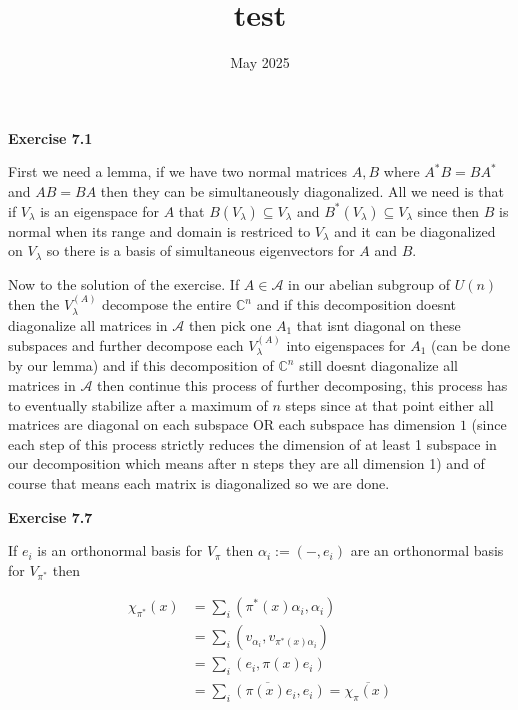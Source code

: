 \documentclass{article}
\title{test}
\date{May 2025}
\begin{document}
\vspace{0.5cm}

\textbf{Exercise 7.1}

\vspace{0.5cm}

First we need a lemma, if we have two normal matrices $A,B$ where $A^*B =BA^*$ and $AB = BA$ then they can be simultaneously diagonalized. All we need is that if $V_\lambda$ is an eigenspace for $A$ that $B(V_\lambda) \subseteq V_\lambda$ and $B^*(V_\lambda) \subseteq V_\lambda$ since then $B$ is normal when its range and domain is restriced to $V_\lambda$ and it can be diagonalized on $V_\lambda$ so there is a basis of simultaneous eigenvectors for $A$ and $B$. 

\vspace{0.3cm}

Now to the solution of the exercise. If $A \in\mathcal A$ in our abelian subgroup of $U(n)$ then the $V^{(A)}_\lambda$ decompose the entire $\mathbb C^n$ and if this decomposition doesnt diagonalize all matrices in $\mathcal A$ then pick one $A_1$ that isnt diagonal on these subspaces and further decompose each $V^{(A)}_\lambda$ into eigenspaces for $A_1$ (can be done by our lemma) and if this decomposition of $\mathbb C^n$ still doesnt diagonalize all matrices in $\mathcal A$ then continue this process of further decomposing, this process has to eventually stabilize after a maximum of $n$ steps since at that point either all matrices are diagonal on each subspace OR each subspace has dimension $1$ (since each step of this process strictly reduces the dimension of at least 1 subspace in our decomposition which means after n steps they are all dimension 1) and of course that means each matrix is diagonalized so we are done.

\vspace{0.5cm}

\textbf{Exercise 7.7}

\vspace{0.5cm}

If $e_i$ is an orthonormal basis for $V_\pi$ then $\alpha_i := (-,e_i)$ are an orthonormal basis for $V_{\pi^*}$ then

\begin{align*}
   \chi_{\pi^*}(x) &= \sum\limits_i (\pi^*(x)\alpha_i, \alpha_i) \\
   & = \sum\limits_i (v_{\alpha_i}, v_{\pi^*(x)\alpha_i}) \\
   & = \sum\limits_i (e_i, \pi(x)e_i) \\
   & = \overline{\sum\limits_i (\pi(x)e_i, e_i)} = \overline{\chi_\pi(x)}
\end{align*}
\end{document}
